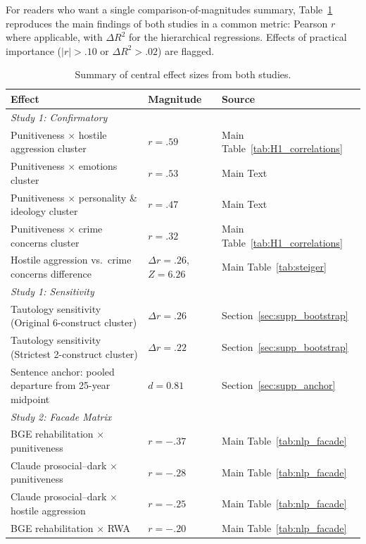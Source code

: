 For readers who want a single comparison-of-magnitudes summary, Table~\ref{tab:supp_effect_summary} reproduces the main findings of both studies in a common metric: Pearson $r$ where applicable, with $\Delta R^2$ for the hierarchical regressions. Effects of practical importance ($|r| > .10$ or $\Delta R^2 > .02$) are flagged.

\begin{table}[htbp]
  \centering
  \caption{Summary of central effect sizes from both studies.}
  \label{tab:supp_effect_summary}
  \footnotesize
  \begin{tabular}{lll}
    \toprule
    Effect & Magnitude & Source \\
    \midrule
    \textit{Study 1: Confirmatory} \\
    Punitiveness $\times$ hostile aggression cluster   & $r = .59$ & Main Table~\ref{tab:H1_correlations} \\
    Punitiveness $\times$ emotions cluster             & $r = .53$ & Main Text \\
    Punitiveness $\times$ personality \& ideology cluster & $r = .47$ & Main Text \\
    Punitiveness $\times$ crime concerns cluster       & $r = .32$ & Main Table~\ref{tab:H1_correlations} \\
    Hostile aggression vs.\ crime concerns difference  & $\Delta r = .26$, $Z = 6.26$ & Main Table~\ref{tab:steiger} \\
    \addlinespace
    \textit{Study 1: Sensitivity} \\
    Tautology sensitivity (Original 6-construct cluster)  & $\Delta r = .26$ & Section~\ref{sec:supp_bootstrap} \\
    Tautology sensitivity (Strictest 2-construct cluster) & $\Delta r = .22$ & Section~\ref{sec:supp_bootstrap} \\
    Sentence anchor: pooled departure from 25-year midpoint & $d = 0.81$ & Section~\ref{sec:supp_anchor} \\
    \addlinespace
    \textit{Study 2: Facade Matrix} \\
    BGE rehabilitation $\times$ punitiveness               & $r = -.37$ & Main Table~\ref{tab:nlp_facade} \\
    Claude prosocial--dark $\times$ punitiveness           & $r = -.28$ & Main Table~\ref{tab:nlp_facade} \\
    Claude prosocial--dark $\times$ hostile aggression     & $r = -.25$ & Main Table~\ref{tab:nlp_facade} \\
    BGE rehabilitation $\times$ RWA                        & $r = -.20$ & Main Table~\ref{tab:nlp_facade} \\

\end{tabular}
\end{table}
